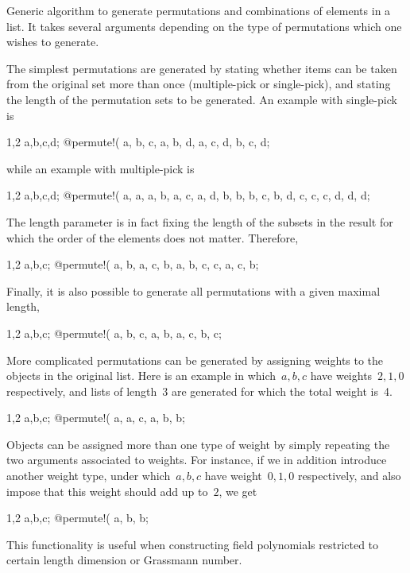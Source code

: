 
Generic algorithm to generate permutations and combinations of
elements in a list. It takes several arguments depending on the type
of permutations which one wishes to generate.

The simplest permutations are generated by stating whether items can
be taken from the original set more than once (multiple-pick or
single-pick), and stating the length of the permutation sets to be
generated. An example with single-pick is
\begin{screen}{1,2}
{a,b,c,d};
@permute!(%
{{a, b, c}, {a, b, d}, {a, c, d}, {b, c, d}};
\end{screen}
while an example with multiple-pick is
\begin{screen}{1,2}
{a,b,c,d};
@permute!(%
{{a, a}, {a, b}, {a, c}, {a, d}, {b, b}, {b, c},
                         {b, d}, {c, c}, {c, d}, {d, d}};
\end{screen}
The length parameter is in fact fixing the length of the subsets in
the result for which the order of the elements does not
matter. Therefore, 
\begin{screen}{1,2}
{a,b,c};
@permute!(%
{{a, b}, {a, c}, {b, a}, {b, c}, {c, a}, {c, b}};
\end{screen}
Finally, it is also possible to generate all permutations with a given
maximal length,
\begin{screen}{1,2}
{a,b,c};
@permute!(%
{{a}, {b}, {c}, {a, b}, {a, c}, {b, c}};
\end{screen}

More complicated permutations can be generated by assigning weights to
the objects in the original list. Here is an example in which~$a,b,c$
have weights~$2,1,0$ respectively, and lists of length~3 are generated
for which the total weight is~4.
\begin{screen}{1,2}
{a,b,c};
@permute!(%
{{a, a, c}, {a, b, b}};
\end{screen}
Objects can be assigned more than one type of weight by simply
repeating the two arguments associated to weights. For instance, if we
in addition introduce another weight type, under which~$a,b,c$ have
weight~$0,1,0$ respectively, and also impose that this weight should
add up to~$2$, we get
\begin{screen}{1,2}
{a,b,c};
@permute!(%
{{a, b, b}};
\end{screen}
This functionality is useful when constructing field polynomials
restricted to certain length dimension or Grassmann number.


